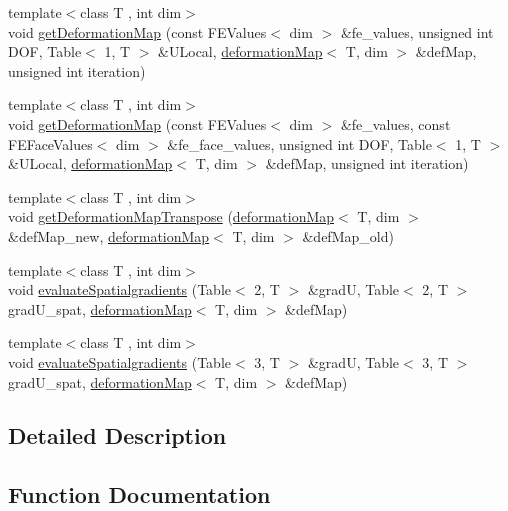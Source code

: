 \begin{DoxyCompactItemize}
\item 
{\footnotesize template$<$class T , int dim$>$ }\\void \mbox{\hyperlink{group___evaluation_functions_ga62b026b5bcee0bda21159ff6782b4b59}{get\+Deformation\+Map}} (const F\+E\+Values$<$ dim $>$ \&fe\+\_\+values, unsigned int D\+OF, Table$<$ 1, T $>$ \&U\+Local, \mbox{\hyperlink{structdeformation_map}{deformation\+Map}}$<$ T, dim $>$ \&def\+Map, unsigned int iteration)
\item 
{\footnotesize template$<$class T , int dim$>$ }\\void \mbox{\hyperlink{group___evaluation_functions_ga239b206235603af9482484c29c8d57ea}{get\+Deformation\+Map}} (const F\+E\+Values$<$ dim $>$ \&fe\+\_\+values, const F\+E\+Face\+Values$<$ dim $>$ \&fe\+\_\+face\+\_\+values, unsigned int D\+OF, Table$<$ 1, T $>$ \&U\+Local, \mbox{\hyperlink{structdeformation_map}{deformation\+Map}}$<$ T, dim $>$ \&def\+Map, unsigned int iteration)
\item 
{\footnotesize template$<$class T , int dim$>$ }\\void \mbox{\hyperlink{group___evaluation_functions_gad4003712a2346a79e13bdbfcad4d1e1c}{get\+Deformation\+Map\+Transpose}} (\mbox{\hyperlink{structdeformation_map}{deformation\+Map}}$<$ T, dim $>$ \&def\+Map\+\_\+new, \mbox{\hyperlink{structdeformation_map}{deformation\+Map}}$<$ T, dim $>$ \&def\+Map\+\_\+old)
\item 
{\footnotesize template$<$class T , int dim$>$ }\\void \mbox{\hyperlink{group___evaluation_functions_gadb862d9530a60b8ce5255222778ceeb6}{evaluate\+Spatialgradients}} (Table$<$ 2, T $>$ \&gradU, Table$<$ 2, T $>$ grad\+U\+\_\+spat, \mbox{\hyperlink{structdeformation_map}{deformation\+Map}}$<$ T, dim $>$ \&def\+Map)
\item 
{\footnotesize template$<$class T , int dim$>$ }\\void \mbox{\hyperlink{group___evaluation_functions_ga0b976342d491f6215953e2e65ea6a0de}{evaluate\+Spatialgradients}} (Table$<$ 3, T $>$ \&gradU, Table$<$ 3, T $>$ grad\+U\+\_\+spat, \mbox{\hyperlink{structdeformation_map}{deformation\+Map}}$<$ T, dim $>$ \&def\+Map)
\end{DoxyCompactItemize}


\subsection{Detailed Description}


\subsection{Function Documentation}
\mbox{\label{group___evaluation_functions_ga399ae2353249293211c021848a64175c}} 
